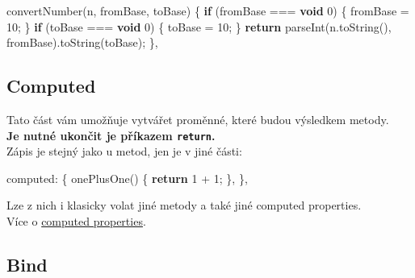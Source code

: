 \documentclass[
]{article}
\newenvironment{Shaded}{}{}
\newcommand{\AttributeTok}[1]{\textcolor[rgb]{0.49,0.56,0.16}{#1}}
\newcommand{\ControlFlowTok}[1]{\textcolor[rgb]{0.00,0.44,0.13}{\textbf{#1}}}
\newcommand{\DecValTok}[1]{\textcolor[rgb]{0.25,0.63,0.44}{#1}}
\newcommand{\KeywordTok}[1]{\textcolor[rgb]{0.00,0.44,0.13}{\textbf{#1}}}
\newcommand{\NormalTok}[1]{#1}
\newcommand{\OperatorTok}[1]{\textcolor[rgb]{0.40,0.40,0.40}{#1}}
\newcommand{\VariableTok}[1]{\textcolor[rgb]{0.10,0.09,0.49}{#1}}
\begin{document}
\begin{Shaded}
\begin{Highlighting}[]
\AttributeTok{convertNumber}\NormalTok{(n}\OperatorTok{,}\NormalTok{ fromBase}\OperatorTok{,}\NormalTok{ toBase) }\OperatorTok{\{}
    \ControlFlowTok{if}\NormalTok{ (fromBase }\OperatorTok{===} \KeywordTok{void} \DecValTok{0}\NormalTok{) }\OperatorTok{\{}
\NormalTok{      fromBase }\OperatorTok{=} \DecValTok{10}\OperatorTok{;}
    \OperatorTok{\}}
    \ControlFlowTok{if}\NormalTok{ (toBase }\OperatorTok{===} \KeywordTok{void} \DecValTok{0}\NormalTok{) }\OperatorTok{\{}
\NormalTok{       toBase }\OperatorTok{=} \DecValTok{10}\OperatorTok{;}
    \OperatorTok{\}}
    \ControlFlowTok{return} \AttributeTok{parseInt}\NormalTok{(}\VariableTok{n}\NormalTok{.}\AttributeTok{toString}\NormalTok{()}\OperatorTok{,}\NormalTok{ fromBase).}\AttributeTok{toString}\NormalTok{(toBase)}\OperatorTok{;}
\OperatorTok{\},}
\end{Highlighting}
\end{Shaded}

\hypertarget{computed}{%
\subsection{Computed}\label{computed}}

Tato část vám umožňuje vytvářet proměnné, které budou výsledkem
metody.\\
\textbf{Je nutné ukončit je příkazem \texttt{return}.}\\
Zápis je stejný jako u metod, jen je v jiné části:

\begin{Shaded}
\begin{Highlighting}[]
\NormalTok{computed}\OperatorTok{:} \OperatorTok{\{}
    \AttributeTok{onePlusOne}\NormalTok{() }\OperatorTok{\{}
        \ControlFlowTok{return} \DecValTok{1} \OperatorTok{+} \DecValTok{1}\OperatorTok{;}
    \OperatorTok{\},}
\OperatorTok{\},}
\end{Highlighting}
\end{Shaded}

Lze z nich i klasicky volat jiné metody a také jiné computed
properties.\\
Více o \href{https://vuejs.org/v2/guide/computed.html}{computed
properties}.

\hypertarget{bind}{%
\subsection{Bind}\label{bind}}
\end{document}
